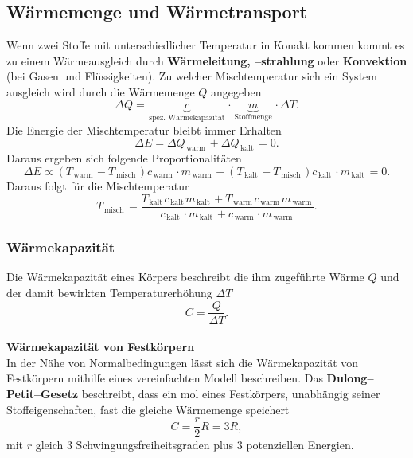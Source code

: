 \documentclass[a4paper,12pt]{article}
\begin{document}
\subsection{Wärmemenge und Wärmetransport}
Wenn zwei Stoffe mit unterschiedlicher Temperatur in Konakt kommen kommt es zu einem Wärmeausgleich durch \textbf{Wärmeleitung, --strahlung} oder \textbf{Konvektion} (bei Gasen und Flüssigkeiten). Zu welcher Mischtemperatur sich ein System ausgleich wird durch die Wärmemenge $Q$ angegeben
\[ 
        \Delta Q=\underbrace{c}_{\,\text{spez. Wärmekapazität}\,}\cdot \underbrace{m}_{\,\text{Stoffmenge}\,}\cdot \Delta T
.\] 
Die Energie der Mischtemperatur bleibt immer Erhalten
\[ 
        \Delta E=\Delta Q_{\,\text{warm}\,}+\Delta Q_{\,\text{kalt}\,}=0
.\] 
Daraus ergeben sich folgende Proportionalitäten
\[ 
        \Delta E\propto \left(T_{\,\text{warm}\,}-T_{\,\text{misch}\,}\right)c _{\,\text{warm}\,}\cdot m_{\,\text{warm}\,}+\left(T_{\,\text{kalt}\,}-T_{\,\text{misch}\,}\right)c _{\,\text{kalt}\,}\cdot m_{\,\text{kalt}\,}=0
.\] 
Daraus folgt für die Mischtemperatur
\[ 
        T_{\,\text{misch}\,}=\dfrac{T_{\,\text{kalt}\,}c _{\,\text{kalt}\,}m_{\,\text{kalt}\,}+T_{\,\text{warm}\,}c _{\,\text{warm}\,}m_{\,\text{warm}\,}}{c _{\,\text{kalt}\,}\cdot m_{\,\text{kalt}\,}+c _{\,\text{warm}\,}\cdot m_{\,\text{warm}\,}}
.\] 

\subsubsection{Wärmekapazität}
Die Wärmekapazität eines Körpers beschreibt die ihm zugeführte Wärme $Q$ und der damit bewirkten Temperaturerhöhung $\Delta T$ 
\[ 
        C=\dfrac{Q}{\Delta T}
.\] 
\hfill\\\textbf{Wärmekapazität von Festkörpern}\\ 
In der Nähe von Normalbedingungen lässt sich die Wärmekapazität von Festkörpern mithilfe eines vereinfachten Modell beschreiben. Das \textbf{Dulong--Petit--Gesetz} beschreibt, dass ein mol eines Festkörpers, unabhängig seiner Stoffeigenschaften, fast die gleiche Wärmemenge speichert
\[ 
        C=\dfrac{r}{2}R=3R
,\] 
mit $r$ gleich 3 Schwingungsfreiheitsgraden plus 3 potenziellen Energien.

\newpage
\end{document}
